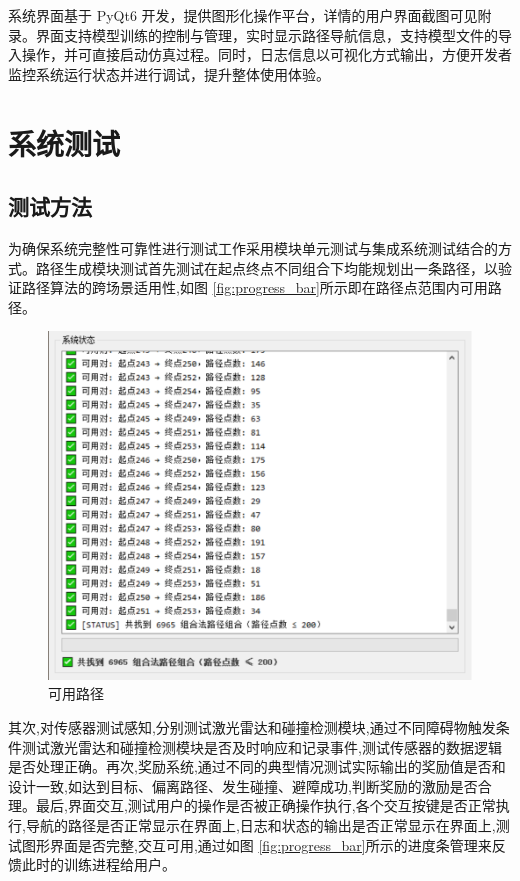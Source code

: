 系统界面基于 PyQt6 开发，提供图形化操作平台，详情的用户界面截图可见附录。界面支持模型训练的控制与管理，实时显示路径导航信息，支持模型文件的导入操作，并可直接启动仿真过程。同时，日志信息以可视化方式输出，方便开发者监控系统运行状态并进行调试，提升整体使用体验。

\section{系统测试}

\subsection{测试方法}

为确保系统完整性可靠性进行测试工作采用模块单元测试与集成系统测试结合的方式。路径生成模块测试首先测试在起点终点不同组合下均能规划出一条路径，以验证路径算法的跨场景适用性,如图 \ref{fig:progress_bar}所示即在路径点范围内可用路径。

\begin{figure}[H]
    \centering
    \includegraphics[width=1\textwidth]{images/available_path.pdf}
    \caption{可用路径}
    \label{fig:available_path}
\end{figure}

其次,对传感器测试感知,分别测试激光雷达和碰撞检测模块,通过不同障碍物触发条件测试激光雷达和碰撞检测模块是否及时响应和记录事件,测试传感器的数据逻辑是否处理正确。再次,奖励系统,通过不同的典型情况测试实际输出的奖励值是否和设计一致,如达到目标、偏离路径、发生碰撞、避障成功,判断奖励的激励是否合理。最后,界面交互,测试用户的操作是否被正确操作执行,各个交互按键是否正常执行,导航的路径是否正常显示在界面上,日志和状态的输出是否正常显示在界面上,测试图形界面是否完整,交互可用,通过如图 \ref{fig:progress_bar}所示的进度条管理来反馈此时的训练进程给用户。

